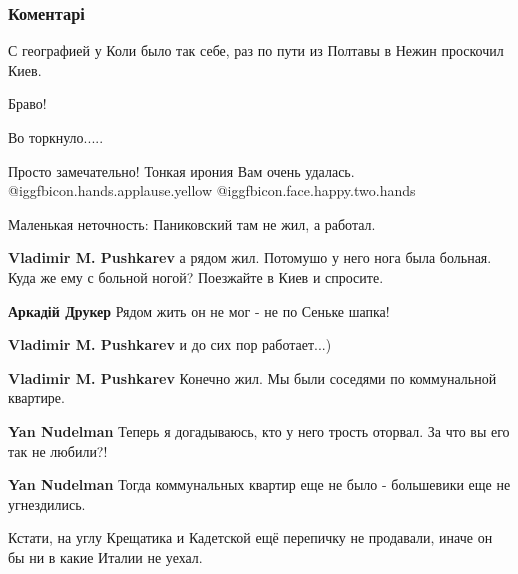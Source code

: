  
 
 
 
 
\subsubsection{Коментарі}
\label{sec:28_09_2021.fb.fb_group.story_kiev_ua.1.gogol_i_kiev.cmt}

\begin{itemize} %
С географией у Коли было так себе, раз по пути из Полтавы в Нежин проскочил Киев.

Браво!

Во торкнуло.....


Просто замечательно! Тонкая ирония Вам очень удалась.
@igg{fbicon.hands.applause.yellow}  @igg{fbicon.face.happy.two.hands} 

Маленькая неточность: Паниковский там не жил, а работал.

\begin{itemize} %
\textbf{Vladimir M. Pushkarev} а рядом жил. Потомушо у него нога была больная. Куда же ему с больной ногой? Поезжайте в Киев и спросите.

\textbf{Аркадій Друкер} Рядом жить он не мог - не по Сеньке шапка!

\textbf{Vladimir M. Pushkarev} и до сих пор работает...)

\textbf{Vladimir M. Pushkarev} Конечно жил. Мы были соседями по коммунальной квартире.

\textbf{Yan Nudelman} Теперь я догадываюсь, кто у него трость оторвал. За что вы его так не любили?!

\textbf{Yan Nudelman} Тогда коммунальных квартир еще не было - большевики еще не угнездились.
\end{itemize} %

Кстати, на углу Крещатика и Кадетской ещё перепичку не продавали, иначе он бы ни в какие Италии не уехал.


\end{itemize}
